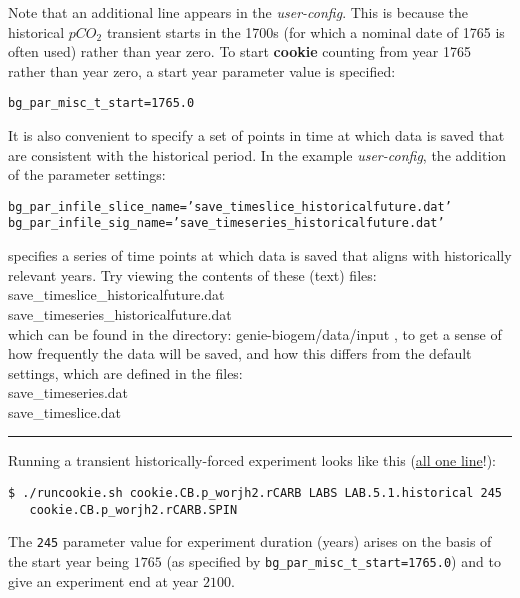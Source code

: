 Note that an additional line appears in the \textit{user-config}. This is because the historical \(pCO_{2}\) transient starts in the 1700s (for which a nominal date of 1765 is often used) rather than year zero. To start \textbf{cookie} counting from year 1765 rather than year zero, a start year parameter value is specified:
\vspace{-2pt}\small\begin{verbatim}
bg_par_misc_t_start=1765.0
\end{verbatim}\normalsize\vspace{-2pt}
It is also convenient to specify a set of points in time at which data is saved that are consistent with the historical period. In the example \textit{user-config}, the addition of the parameter settings:
\vspace{-2pt}\small\begin{verbatim}
bg_par_infile_slice_name=’save_timeslice_historicalfuture.dat’
bg_par_infile_sig_name=’save_timeseries_historicalfuture.dat’
\end{verbatim}\normalsize\vspace{-2pt}
specifies a series of time points at which data is saved that aligns with historically relevant years. Try viewing the contents of these (text) files:
\vspace{2pt}
\\ \footnotesize\textsf{save\_timeslice\_historicalfuture.dat }\normalsize
\\ \footnotesize\textsf{save\_timeseries\_historicalfuture.dat }\normalsize
\vspace{2pt}
\\which can be found in the directory: \footnotesize\textsf{genie-biogem/data/input }\normalsize, to get a sense of how frequently the data will be saved, and how this differs from the default settings, which are defined in the files:
\vspace{2pt}
\\ \footnotesize\textsf{save\_timeseries.dat }\normalsize
\\ \footnotesize\textsf{save\_timeslice.dat }\normalsize
\vspace{2pt}

\vspace{1mm}\noindent\rule{4cm}{0.1mm}\vspace{2mm}

\noindent Running a transient historically-forced experiment looks like this (\uline{all one line}!):
\vspace{-2pt}\small\begin{verbatim}
$ ./runcookie.sh cookie.CB.p_worjh2.rCARB LABS LAB.5.1.historical 245
   cookie.CB.p_worjh2.rCARB.SPIN
\end{verbatim}\normalsize\vspace{-2pt}
The \texttt{245} parameter value for experiment duration (years) arises on the basis of the start year being \(1765\) (as specified by \texttt{\small bg\_par\_misc\_t\_start=1765.0}) and to give an experiment end at year \(2100\).

